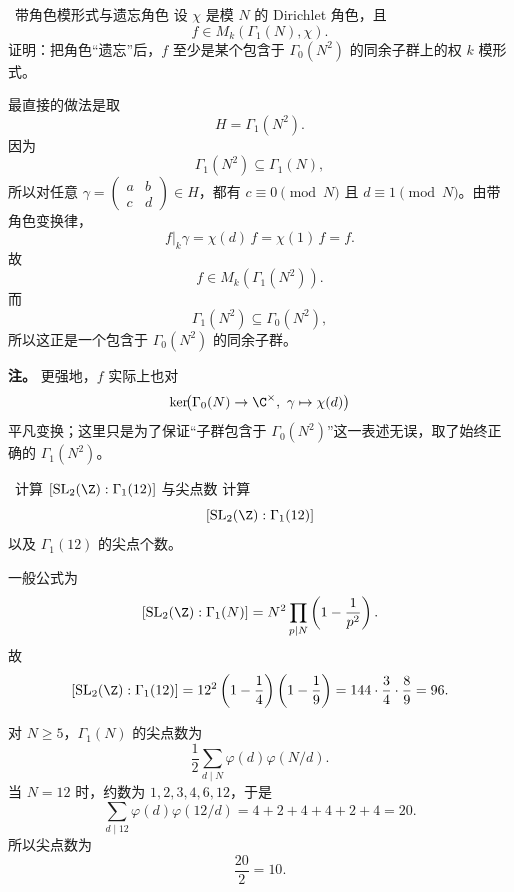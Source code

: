 \begin{problem}{\medium\ 带角色模形式与遗忘角色}
设 $\chi$ 是模 $N$ 的 Dirichlet 角色，且
\[
f\in M_k(\Gamma_1(N),\chi).
\]
证明：把角色“遗忘”后，$f$ 至少是某个包含于 $\Gamma_0(N^2)$ 的同余子群上的权 $k$ 模形式。
\end{problem}
\begin{solution}
最直接的做法是取
\[
H=\Gamma_1(N^2).
\]
因为
\[
\Gamma_1(N^2)\subseteq \Gamma_1(N),
\]
所以对任意 $\gamma=\begin{pmatrix}a&b\\c&d\end{pmatrix}\in H$，都有 $c\equiv0\pmod{N}$ 且 $d\equiv1\pmod N$。由带角色变换律，
\[
f|_k\gamma=\chi(d)\,f=\chi(1)\,f=f.
\]
故
\[
f\in M_k(\Gamma_1(N^2)).
\]
而
\[
\Gamma_1(N^2)\subseteq \Gamma_0(N^2),
\]
所以这正是一个包含于 $\Gamma_0(N^2)$ 的同余子群。

\textbf{注。} 更强地，$f$ 实际上也对
\[
\ker\!\bigl(\Gamma_0(N)\to \C^\times,\ \gamma\mapsto \chi(d)\bigr)
\]
平凡变换；这里只是为了保证“子群包含于 $\Gamma_0(N^2)$”这一表述无误，取了始终正确的 $\Gamma_1(N^2)$。
\end{solution}

\begin{problem}{\medium\ 计算 $[\mathrm{SL}_2(\Z):\Gamma_1(12)]$ 与尖点数}
计算
\[
[\mathrm{SL}_2(\Z):\Gamma_1(12)]
\]
以及 $\Gamma_1(12)$ 的尖点个数。
\end{problem}
\begin{solution}
一般公式为
\[
[\mathrm{SL}_2(\Z):\Gamma_1(N)]
= N^2\prod_{p\mid N}\left(1-\frac1{p^2}\right).
\]
故
\[
[\mathrm{SL}_2(\Z):\Gamma_1(12)]
=12^2\left(1-\frac14\right)\left(1-\frac19\right)
=144\cdot \frac34\cdot \frac89
=96.
\]

对 $N\ge5$，$\Gamma_1(N)$ 的尖点数为
\[
\frac12\sum_{d\mid N}\varphi(d)\varphi(N/d).
\]
当 $N=12$ 时，约数为 $1,2,3,4,6,12$，于是
\[
\sum_{d\mid12}\varphi(d)\varphi(12/d)
=4+2+4+4+2+4=20.
\]
所以尖点数为
\[
\frac{20}{2}=10.
\]
\end{solution}

